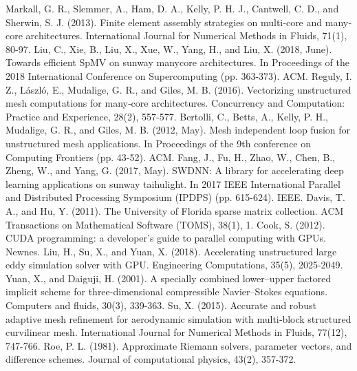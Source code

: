 \documentclass[5p,times]{elsarticle}
\begin{document}
\begin{thebibliography}{00}
 Markall, G. R., Slemmer, A., Ham, D. A., Kelly, P. H. J., Cantwell, C. D., and Sherwin, S. J. (2013). Finite element assembly strategies on multi‐core and many‐core architectures. International Journal for Numerical Methods in Fluids, 71(1), 80-97.
 Liu, C., Xie, B., Liu, X., Xue, W., Yang, H., and Liu, X. (2018, June). Towards efficient SpMV on sunway manycore architectures. In Proceedings of the 2018 International Conference on Supercomputing (pp. 363-373). ACM.
 Reguly, I. Z., László, E., Mudalige, G. R., and Giles, M. B. (2016). Vectorizing unstructured mesh computations for many‐core architectures. Concurrency and Computation: Practice and Experience, 28(2), 557-577.
 Bertolli, C., Betts, A., Kelly, P. H., Mudalige, G. R., and Giles, M. B. (2012, May). Mesh independent loop fusion for unstructured mesh applications. In Proceedings of the 9th conference on Computing Frontiers (pp. 43-52). ACM.
 Fang, J., Fu, H., Zhao, W., Chen, B., Zheng, W., and Yang, G. (2017, May). SWDNN: A library for accelerating deep learning applications on sunway taihulight. In 2017 IEEE International Parallel and Distributed Processing Symposium (IPDPS) (pp. 615-624). IEEE.
 Davis, T. A., and Hu, Y. (2011). The University of Florida sparse matrix collection. ACM Transactions on Mathematical Software (TOMS), 38(1), 1.
 Cook, S. (2012). CUDA programming: a developer's guide to parallel computing with GPUs. Newnes.
 Liu, H., Su, X., and Yuan, X. (2018). Accelerating unstructured large eddy simulation solver with GPU. Engineering Computations, 35(5), 2025-2049.
 Yuan, X., and Daiguji, H. (2001). A specially combined lower–upper factored implicit scheme for three-dimensional compressible Navier–Stokes equations. Computers and fluids, 30(3), 339-363.
 Su, X. (2015). Accurate and robust adaptive mesh refinement for aerodynamic simulation with multi‐block structured curvilinear mesh. International Journal for Numerical Methods in Fluids, 77(12), 747-766.
 Roe, P. L. (1981). Approximate Riemann solvers, parameter vectors, and difference schemes. Journal of computational physics, 43(2), 357-372.

\end{thebibliography}
\end{document}
